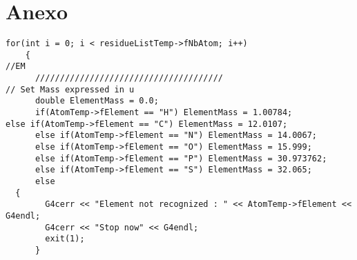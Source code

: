 \clearpage
\section{Anexo}
\label{app:A}
\lstset {language=C++}
\begin{lstlisting}
for(int i = 0; i < residueListTemp->fNbAtom; i++)
    {
//EM
      //////////////////////////////////////
// Set Mass expressed in u
      double ElementMass = 0.0;
      if(AtomTemp->fElement == "H") ElementMass = 1.00784;
else if(AtomTemp->fElement == "C") ElementMass = 12.0107;
      else if(AtomTemp->fElement == "N") ElementMass = 14.0067;
      else if(AtomTemp->fElement == "O") ElementMass = 15.999;
      else if(AtomTemp->fElement == "P") ElementMass = 30.973762;
      else if(AtomTemp->fElement == "S") ElementMass = 32.065;
      else
  {
        G4cerr << "Element not recognized : " << AtomTemp->fElement << G4endl;
        G4cerr << "Stop now" << G4endl;
        exit(1);
      }
\end{lstlisting}
